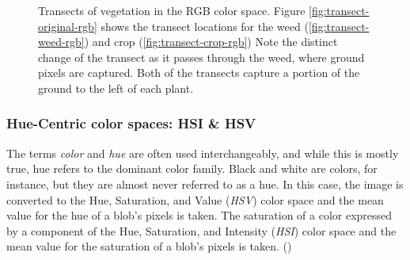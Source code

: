 \documentclass[letterpaper]{report}
\begin{document}
\begin{figure}[h]
	\centering
	\hfill
	\hfill
	\caption[RGB Transects]{Transects of vegetation in the RGB color space. Figure \ref{fig:transect-original-rgb} shows the transect locations for the weed (\ref{fig:transect-weed-rgb}) and crop (\ref{fig:transect-crop-rgb}) Note the distinct change of the transect as it passes through the weed, where ground pixels are captured. Both of the transects capture a portion of the ground to the left of each plant.}
	\label{fig:transects-rgb}
\end{figure}
	
\subsubsection{Hue-Centric color spaces: HSI \& HSV}
The terms {\it color} and {\it hue} are often used interchangeably, and while this is mostly true, hue refers to the dominant color family. Black and white are colors, for instance, but they are almost never referred to as a hue. In this case, the image is converted to the Hue, Saturation, and Value ({\it HSV}) color space and the mean value for the hue of a blob's pixels is taken. The saturation of a color expressed by a component of the Hue, Saturation, and Intensity ({\it HSI}) color space and the mean value for the saturation of a blob's pixels is taken. (\cite{Forsyth2012-hy})
\end{document}
